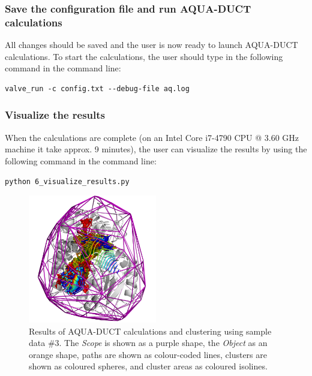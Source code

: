 \documentclass[9pt,tutorial]{livecoms}
\begin{document}
\subsubsection{Save the configuration file and run AQUA-DUCT calculations}
All changes should be saved and the user is now ready to launch AQUA-DUCT calculations. To start the calculations, the user should type in the following command in the command line:
\begin{lstlisting}
valve_run -c config.txt --debug-file aq.log 
\end{lstlisting}

\subsubsection{Visualize the results}
When the calculations are complete (on an Intel Core i7-4790 CPU @ 3.60 GHz machine it take approx. 9 minutes), the user can visualize the results by using the following command in the command line:
\begin{lstlisting}
python 6_visualize_results.py
\end{lstlisting}

\begin{figure}[ht!]
\centering
\includegraphics[width=0.5\textwidth]{Tut6.1.png}
\caption{Results of AQUA-DUCT calculations and clustering using sample data \#3. The \textit{Scope} is shown as a purple shape, the \textit{Object} as an orange shape, paths are shown as colour-coded lines, clusters are shown as coloured spheres, and cluster areas as coloured isolines.}
\label{Tut6.1}
\end{figure}
\end{document}
